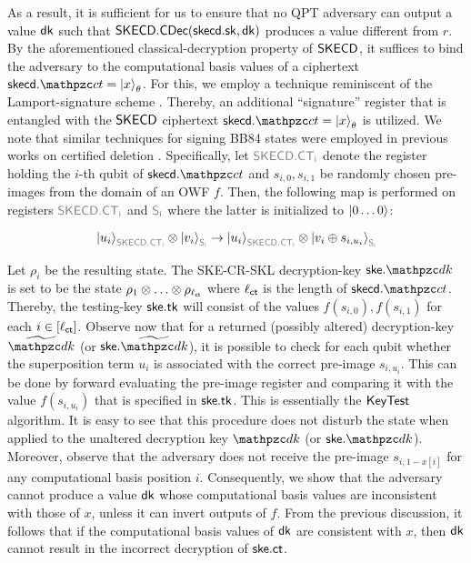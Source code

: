 As a result, it is sufficient for us to ensure that no QPT adversary
can output a value $\mathsf{dk}$ such that
$\mathsf{SKECD}.\mathsf{CDec}(\mathsf{skecd}.\mathsf{sk},\allowbreak \mathsf{dk})$
produces a value different from $r$. By the aforementioned
classical-decryption property of $\mathsf{SKECD}$, it suffices to bind the
adversary to the computational basis values of a ciphertext
$\skecd.\qct = \ket{x}_\theta$. For this, we employ a technique
reminiscent of the Lamport-signature scheme \cite{Lamport79}. Thereby, an additional ``signature'' register that is entangled with
the $\mathsf{SKECD}$ ciphertext $\skecd.\qct = \ket{x}_\theta$ is utilized. We
note that similar
techniques for signing BB84 states were employed in previous works on
certified deletion \cite{EC:HKMNPY24,TCC:KitNisYam23}.
Specifically, let $\qreg{SKECD.CT_i}$ denote the
register holding the $i$-th qubit of $\skecd.\qct$ and $s_{i,0}, s_{i,1}$ be
randomly chosen pre-images from the domain of an OWF $f$.  Then, the
following map is performed on registers $\qreg{SKECD.CT_i}$ and
$\qreg{S_i}$ where the latter is initialized to $\ket{0 \ldots 0}$:

$$\ket{u_i}_{\qreg{SKECD.CT_i}} \otimes \ket{v_i}_{\qreg{S_i}}
\ra \ket{u_i}_{\qreg{SKECD.CT_i}} \otimes \ket{v_i \xor
s_{i,u_i}}_\qreg{S_i}$$

Let $\rho_i$ be the resulting state. The SKE-CR-SKL decryption-key
$\ske.\qdk$ is
set to be the state $\rho_1 \otimes \ldots \otimes \rho_{\ell_{\mathsf{ct}}}$
where $\ell_{\mathsf{ct}}$ is the length of $\skecd.\qct$. Thereby, the testing-key
$\mathsf{ske}.\mathsf{tk}$ will consist of the values $f(s_{i, 0}), f(s_{i, 1})$ for each
$i \in [\ell_{\mathsf{ct}}]$. Observe now that for a returned (possibly altered)
decryption-key $\widetilde{\qdk}$ (or $\ske.\widetilde{\qdk}$), it is possible to check for each
qubit whether the superposition term $u_i$ is associated with the
correct pre-image $s_{i,u_i}$. This can be done by forward
evaluating the pre-image register and comparing it with the value
$f(s_{i, u_i})$ that is specified in $\mathsf{ske}.\mathsf{tk}$. This is essentially the
$\mathsf{KeyTest}$ algorithm. It is easy to see that this procedure does
not disturb the state when applied to the unaltered
decryption key $\qdk$ (or $\ske.\qdk$). Moreover, observe that the adversary does not
receive the pre-image $s_{i, 1-x[i]}$ for any computational basis
position $i$. Consequently, we show that the adversary cannot
produce a value $\mathsf{dk}$ whose computational basis values are
inconsistent with those of $x$, unless it can invert outputs of $f$.
From the previous discussion, it follows that if the computational
basis values of $\mathsf{dk}$ are consistent with $x$, then $\mathsf{dk}$ cannot
result in the incorrect decryption of $\mathsf{ske}.\mathsf{ct}$.

